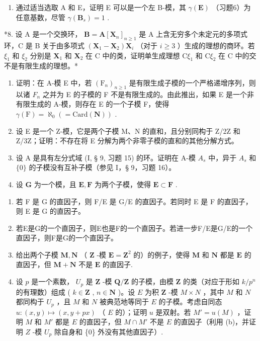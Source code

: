\begin{enumerate}
\def\labelenumi{(\alph{enumi})}
\setcounter{enumi}{1}
\tightlist
\item
  通过适当选取 A 和 E，证明 E 可以是一个左 B-模，其 \(\gamma(\mathbf{E})\) （习题6）为任意基数，尽管 \(\gamma(\mathbf{B}_{s}) = 1\) .
\end{enumerate}

*8. 设 A 是一个交换环， \(\mathbf{B} = \mathbf{A}[\mathbf{X}_n]_{n\geqslant 1}\) 是 A 上含无穷多个未定元的多项式环，C 是 B 关于由多项式 \((\mathbf{X}_1 - \mathbf{X}_2)\mathbf{X}_i\) （对于 \(i\geqslant 3\) ）生成的理想的商环。若 \(\xi_1\) 和 \(\xi_2\) 分别是 \(\mathbf{X}_1\) 和 \(\mathbf{X}_2\) 在 C 中的类，证明单生成理想 \(\mathrm{C}\xi_1\) 和 \(\mathrm{C}\xi_2\) 在 C 中的交不是有限生成的理想。*

\begin{enumerate}
\def\labelenumi{\arabic{enumi}.}
\setcounter{enumi}{8}
\item
  证明：在 A-模 E 中，若 \((\mathrm{F}_{n})_{n\geqslant1}\) 是有限生成子模的一个严格递增序列，则以诸 \(F_{n}\) 之并为 E 的子模的 F 不是有限生成的。由此推出，如果 E 是一个非有限生成的 A-模，则存在 E 的一个子模 F，使得 \(\gamma(\mathrm{F})=\aleph_{0}(=\mathrm{Card}(\mathbf{N}))\) .
\item
  设 E 是一个 Z-模，它是两个子模 M、N 的直和，且分别同构于 Z/2Z 和 Z/3Z；证明：不存在将 E 分解为两个非零子模的直和的其他分解方式。
\item
  设 A 是具有左分式域 (I, § 9, 习题 15) 的环。证明在 A-模 \(A_{s}\) 中，异于 \(A_{s}\) 和 \(\{0\}\) 的子模没有互补子模（参见 I，§ 9，习题 16）。
\item
  设 \(\mathbf{G}\) 为一个模，且 \(\mathbf{E}, \mathbf{F}\) 为两个子模，使得 \(\mathbf{E} \subset \mathbf{F}\) .
\end{enumerate}

\begin{enumerate}
\def\labelenumi{(\alph{enumi})}
\item
  若 F 是 G 的直因子，则 F/E 是 G/E 的直因子。若同时 E 是 F 的直因子，则 E 是 G 的直因子。
\item
  若E是G的一个直因子，则E也是F的一个直因子。若进一步F/E是G/E的一个直因子，则F是G的一个直因子。
\item
  给出两个子模 \(\mathbf{M}, \mathbf{N}\) （ \(\mathbf{Z}\) -模 \(\mathbf{E} = \mathbf{Z}^2\) 的）的例子，使得 \(\mathbf{M}\) 和 \(\mathbf{N}\) 都是 \(\mathbf{E}\) 的直因子，但 \(\mathbf{M} + \mathbf{N}\) 不是 \(\mathbf{E}\) 的直因子.
\item
  设 \(p\) 是一个素数， \(U_p\) 是 \(\mathbf{Z}\) -模 \(\mathbf{Q} / \mathbf{Z}\) 的子模，由模 \(\mathbf{Z}\) 的类（对应于形如 \(k / p^n\) 的有理数）组成 ( \(k \in \mathbf{Z}\) , \(n \in \mathbf{N}\) )。设 \(E\) 为积 \(\mathbf{Z}\) -模 \(M \times N\) ，其中 \(M\) 和 \(N\) 都同构于 \(U_p\) ，且 \(M\) 和 \(N\) 被典范地等同于 \(E\) 的子模。考虑自同态 \(u: (x, y) \mapsto (x, y + px)\) （ \(E\) 的）；证明 \(u\) 是双射。若 \(M' = u(M)\) ，证明 \(M\) 和 \(M'\) 都是 \(E\) 的直因子，但 \(M \cap M'\) 不是 \(E\) 的直因子（利用 (b)，并证明 \(Z\) -模 \(U_p\) 除自身和 \{0\} 外没有其他直因子）.
\end{enumerate}

